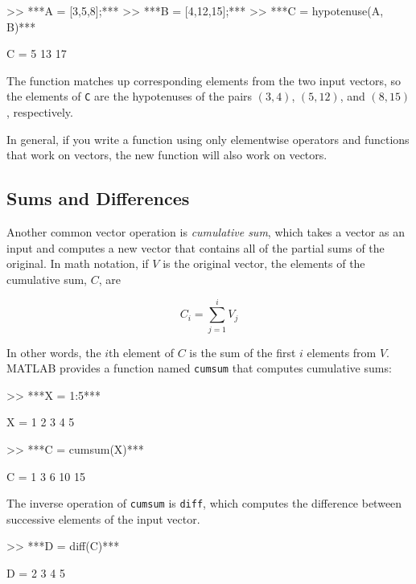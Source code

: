 
\begin{code}
>> ***A = [3,5,8];***
>> ***B = [4,12,15];***
>> ***C = hypotenuse(A, B)***

C = 5    13    17
\end{code}

The function matches up corresponding elements from the two
input vectors, so the elements of \lstinline{C} are the hypotenuses of
the pairs $(3,4)$, $(5,12)$, and $(8,15)$, respectively.

In general, if you write a function using only elementwise
operators and functions that work on vectors, the new
function will also work on vectors.


\subsection{Sums and Differences}

Another common vector operation is \emph{cumulative sum}, which takes a vector as an input and computes a new vector that contains all of the partial sums of the original.  In math notation, if $V$ is the original vector, the elements of the cumulative sum, $C$, are


\begin{equation*}
C_i = \sum_{j=1}^i V_j
\end{equation*}

In other words, the $i$th element of $C$ is the sum of the first
$i$ elements from $V$.  MATLAB provides a function named \lstinline{cumsum} that computes cumulative sums:


\begin{code}
>> ***X = 1:5***

X = 1     2     3     4     5

>> ***C = cumsum(X)***

C = 1     3     6    10    15
\end{code}

The inverse operation of \lstinline{cumsum} is \lstinline{diff}, which computes
the difference between successive elements of the input vector.


\begin{code}
>> ***D = diff(C)***

D = 2     3     4     5
\end{code}

